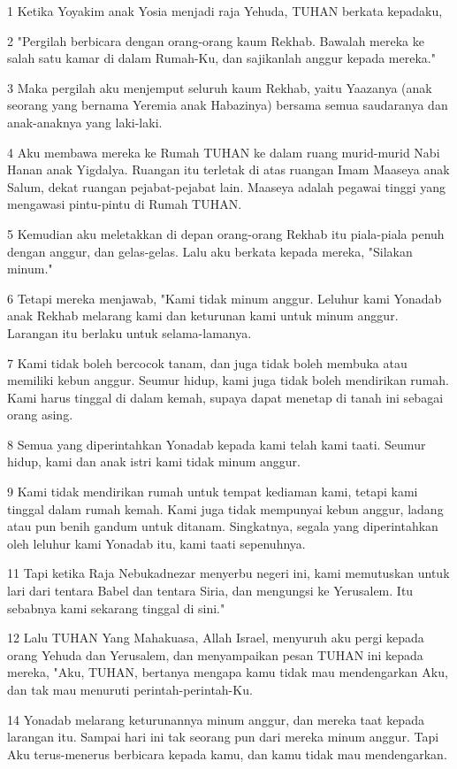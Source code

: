 \par 1 Ketika Yoyakim anak Yosia menjadi raja Yehuda, TUHAN berkata kepadaku,
\par 2 "Pergilah berbicara dengan orang-orang kaum Rekhab. Bawalah mereka ke salah satu kamar di dalam Rumah-Ku, dan sajikanlah anggur kepada mereka."
\par 3 Maka pergilah aku menjemput seluruh kaum Rekhab, yaitu Yaazanya (anak seorang yang bernama Yeremia anak Habazinya) bersama semua saudaranya dan anak-anaknya yang laki-laki.
\par 4 Aku membawa mereka ke Rumah TUHAN ke dalam ruang murid-murid Nabi Hanan anak Yigdalya. Ruangan itu terletak di atas ruangan Imam Maaseya anak Salum, dekat ruangan pejabat-pejabat lain. Maaseya adalah pegawai tinggi yang mengawasi pintu-pintu di Rumah TUHAN.
\par 5 Kemudian aku meletakkan di depan orang-orang Rekhab itu piala-piala penuh dengan anggur, dan gelas-gelas. Lalu aku berkata kepada mereka, "Silakan minum."
\par 6 Tetapi mereka menjawab, "Kami tidak minum anggur. Leluhur kami Yonadab anak Rekhab melarang kami dan keturunan kami untuk minum anggur. Larangan itu berlaku untuk selama-lamanya.
\par 7 Kami tidak boleh bercocok tanam, dan juga tidak boleh membuka atau memiliki kebun anggur. Seumur hidup, kami juga tidak boleh mendirikan rumah. Kami harus tinggal di dalam kemah, supaya dapat menetap di tanah ini sebagai orang asing.
\par 8 Semua yang diperintahkan Yonadab kepada kami telah kami taati. Seumur hidup, kami dan anak istri kami tidak minum anggur.
\par 9 Kami tidak mendirikan rumah untuk tempat kediaman kami, tetapi kami tinggal dalam rumah kemah. Kami juga tidak mempunyai kebun anggur, ladang atau pun benih gandum untuk ditanam. Singkatnya, segala yang diperintahkan oleh leluhur kami Yonadab itu, kami taati sepenuhnya.
\par 11 Tapi ketika Raja Nebukadnezar menyerbu negeri ini, kami memutuskan untuk lari dari tentara Babel dan tentara Siria, dan mengungsi ke Yerusalem. Itu sebabnya kami sekarang tinggal di sini."
\par 12 Lalu TUHAN Yang Mahakuasa, Allah Israel, menyuruh aku pergi kepada orang Yehuda dan Yerusalem, dan menyampaikan pesan TUHAN ini kepada mereka, "Aku, TUHAN, bertanya mengapa kamu tidak mau mendengarkan Aku, dan tak mau menuruti perintah-perintah-Ku.
\par 14 Yonadab melarang keturunannya minum anggur, dan mereka taat kepada larangan itu. Sampai hari ini tak seorang pun dari mereka minum anggur. Tapi Aku terus-menerus berbicara kepada kamu, dan kamu tidak mau mendengarkan.
